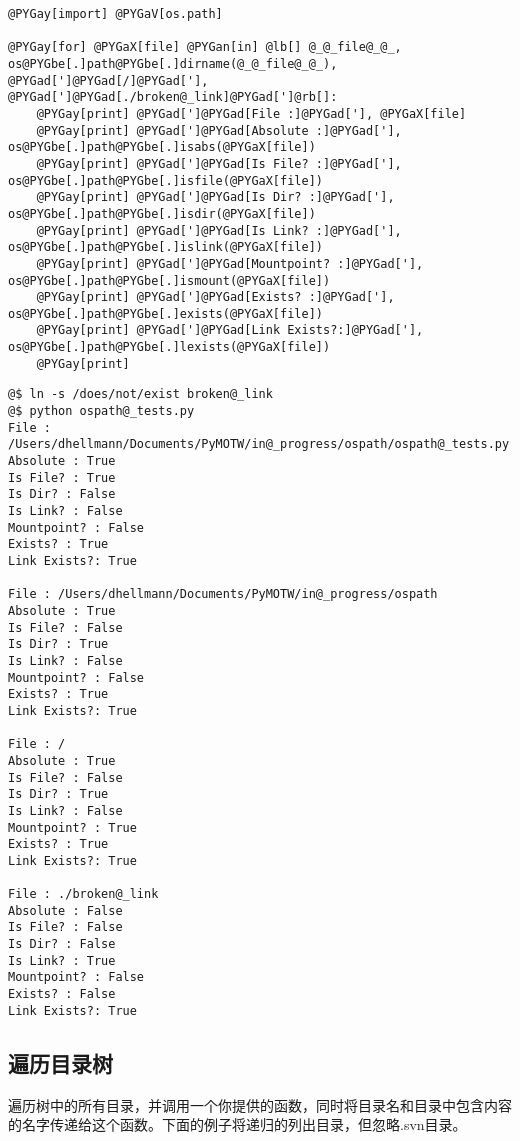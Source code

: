 \documentclass[a4paper,10pt,english]{manual}
\begin{document}
\begin{Verbatim}[commandchars=@\[\]]
@PYGay[import] @PYGaV[os.path]

@PYGay[for] @PYGaX[file] @PYGan[in] @lb[] @_@_file@_@_, os@PYGbe[.]path@PYGbe[.]dirname(@_@_file@_@_), @PYGad[']@PYGad[/]@PYGad['], @PYGad[']@PYGad[./broken@_link]@PYGad[']@rb[]:
    @PYGay[print] @PYGad[']@PYGad[File :]@PYGad['], @PYGaX[file]
    @PYGay[print] @PYGad[']@PYGad[Absolute :]@PYGad['], os@PYGbe[.]path@PYGbe[.]isabs(@PYGaX[file])
    @PYGay[print] @PYGad[']@PYGad[Is File? :]@PYGad['], os@PYGbe[.]path@PYGbe[.]isfile(@PYGaX[file])
    @PYGay[print] @PYGad[']@PYGad[Is Dir? :]@PYGad['], os@PYGbe[.]path@PYGbe[.]isdir(@PYGaX[file])
    @PYGay[print] @PYGad[']@PYGad[Is Link? :]@PYGad['], os@PYGbe[.]path@PYGbe[.]islink(@PYGaX[file])
    @PYGay[print] @PYGad[']@PYGad[Mountpoint? :]@PYGad['], os@PYGbe[.]path@PYGbe[.]ismount(@PYGaX[file])
    @PYGay[print] @PYGad[']@PYGad[Exists? :]@PYGad['], os@PYGbe[.]path@PYGbe[.]exists(@PYGaX[file])
    @PYGay[print] @PYGad[']@PYGad[Link Exists?:]@PYGad['], os@PYGbe[.]path@PYGbe[.]lexists(@PYGaX[file])
    @PYGay[print]
\end{Verbatim}

\begin{Verbatim}[commandchars=@\[\]]
@$ ln -s /does/not/exist broken@_link
@$ python ospath@_tests.py
File : /Users/dhellmann/Documents/PyMOTW/in@_progress/ospath/ospath@_tests.py
Absolute : True
Is File? : True
Is Dir? : False
Is Link? : False
Mountpoint? : False
Exists? : True
Link Exists?: True

File : /Users/dhellmann/Documents/PyMOTW/in@_progress/ospath
Absolute : True
Is File? : False
Is Dir? : True
Is Link? : False
Mountpoint? : False
Exists? : True
Link Exists?: True

File : /
Absolute : True
Is File? : False
Is Dir? : True
Is Link? : False
Mountpoint? : True
Exists? : True
Link Exists?: True

File : ./broken@_link
Absolute : False
Is File? : False
Is Dir? : False
Is Link? : True
Mountpoint? : False
Exists? : False
Link Exists?: True
\end{Verbatim}


\subsection{遍历目录树}

 遍历树中的所有目录，并调用一个你提供的函数，同时将目录名和目录中包含内容的名字传递给这个函数。下面的例子将递归的列出目录，但忽略.svn目录。
\end{document}
